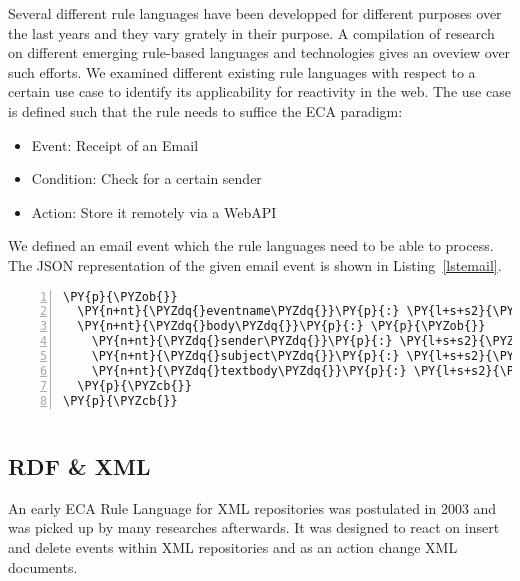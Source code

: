 Several different rule languages have been developped for different purposes over the last years and they vary grately in their purpose.
A compilation of research on different emerging rule-based languages and technologies \cite{2009-Paschke_Boley-RCER.pdf} gives an oveview over such efforts.
We examined different existing rule languages with respect to a certain use case to identify its applicability for reactivity in the web. %
The use case is defined such that the rule needs to suffice the ECA paradigm:

\begin{itemize}
  \item Event: Receipt of an Email
  \item Condition: Check for a certain sender
  \item Action: Store it remotely via a WebAPI
\end{itemize}

We defined an email event which the rule languages need to be able to process.
The JSON representation of the given email event is shown in Listing~\ref{lstemail}.

\begin{Verbatim}[frame=single,fontsize=\footnotesize,commandchars=\\\{\},numbers=left,firstnumber=1,stepnumber=1,xleftmargin
=.3in]
\PY{p}{\PYZob{}}
  \PY{n+nt}{\PYZdq{}eventname\PYZdq{}}\PY{p}{:} \PY{l+s+s2}{\PYZdq{}email\PYZdq{}}\PY{p}{,}
  \PY{n+nt}{\PYZdq{}body\PYZdq{}}\PY{p}{:} \PY{p}{\PYZob{}}
    \PY{n+nt}{\PYZdq{}sender\PYZdq{}}\PY{p}{:} \PY{l+s+s2}{\PYZdq{}sender@mail.com\PYZdq{}}\PY{p}{,}
    \PY{n+nt}{\PYZdq{}subject\PYZdq{}}\PY{p}{:} \PY{l+s+s2}{\PYZdq{}Important subject!\PYZdq{}}\PY{p}{,}
    \PY{n+nt}{\PYZdq{}textbody\PYZdq{}}\PY{p}{:} \PY{l+s+s2}{\PYZdq{}Hi User,\PYZbs{}n\PYZbs{}nThis is a lengthy mail body\PYZdq{}}
  \PY{p}{\PYZcb{}}
\PY{p}{\PYZcb{}}
\end{Verbatim}
\begin{lstlisting}[label=lstemail,caption=Example E-Mail event expressed in JSON]
\end{lstlisting}

\subsection{RDF \& XML}
An early ECA Rule Language for XML repositories\cite{Papamarkos03event-condition-actionrule} was postulated in 2003 and was picked up by many researches afterwards. It was designed to react on insert and delete events within XML repositories and as an action change XML documents.


